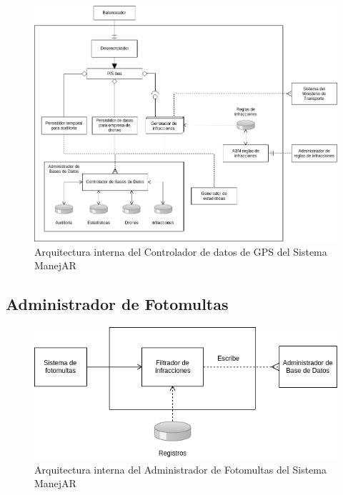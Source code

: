 \begin{figure}
\centerline{\includegraphics[width=1\textwidth]{./imagenes/arquitectura_tp2/controlador_datos_gps.png}}
\caption{Arquitectura interna del Controlador de datos de GPS del Sistema ManejAR}
\end{figure}


\subsection{Administrador de Fotomultas}



\begin{figure}
\centerline{\includegraphics[width=1\textwidth]{./imagenes/arquitectura_tp2/administrador_fotomultas.png}}
\caption{Arquitectura interna del Administrador de Fotomultas del Sistema ManejAR}
\end{figure}


